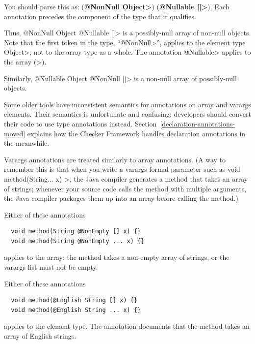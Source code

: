 
You should parse this as:
(\textbf{\<@NonNull Object>}) (\textbf{\<@Nullable []>}).
Each annotation precedes the component of the type that it qualifies.

Thus,
\<@NonNull Object @Nullable []> is a possibly-null array of non-null
objects.  Note that the first token in the type,
``\<@NonNull>'', applies to the element
type \<Object>, not to the array type as a whole.  The annotation \<@Nullable> applies to the
array (\<[]>).

Similarly,
\<@Nullable Object @NonNull []> is a non-null array of possibly-null
objects.

Some older tools have inconsistent semantics for annotations on array and
varargs elements.  Their semantics is unfortunate and confusing; developers
should convert their code to use type annotations instead.
Section~\ref{declaration-annotations-moved} explains how the Checker
Framework handles declaration annotations in the meanwhile.



Varargs annotations are treated similarly to array annotations.
(A way to remember this is that
when you write a varargs formal parameter such as
\<void method(String... x) \ttlcb\ttrcb>, the Java compiler generates a
method that takes an array of strings; whenever your source code calls the
method with multiple arguments, the Java compiler packages them up into an
array before calling the method.)

Either of these annotations

\begin{Verbatim}
  void method(String @NonEmpty [] x) {}
  void method(String @NonEmpty ... x) {}
\end{Verbatim}

\noindent
applies to the array:  the method takes a non-empty array of strings, or
the varargs list must not be empty.

Either of these annotations

\begin{Verbatim}
  void method(@English String [] x) {}
  void method(@English String ... x) {}
\end{Verbatim}

\noindent
applies to the element type. The annotation documents that the method takes an array of English strings.


